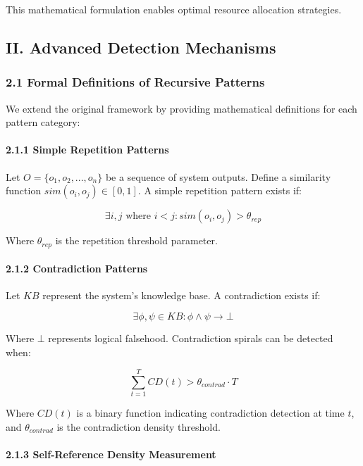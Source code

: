 \documentclass[
]{article}
\begin{document}
This mathematical formulation enables optimal resource allocation
strategies.

\subsection{II. Advanced Detection
Mechanisms}\label{ii.-advanced-detection-mechanisms}

\subsubsection{2.1 Formal Definitions of Recursive
Patterns}\label{formal-definitions-of-recursive-patterns}

We extend the original framework by providing mathematical definitions
for each pattern category:

\paragraph{2.1.1 Simple Repetition
Patterns}\label{simple-repetition-patterns}

Let \(O = \{o_1, o_2, ..., o_n\}\) be a sequence of system outputs.
Define a similarity function \(sim(o_i, o_j) \in [0,1]\). A simple
repetition pattern exists if:

\[\exists i,j \text{ where } i < j: sim(o_i, o_j) > \theta_{rep}\]

Where \(\theta_{rep}\) is the repetition threshold parameter.

\paragraph{2.1.2 Contradiction Patterns}\label{contradiction-patterns}

Let \(KB\) represent the system's knowledge base. A contradiction exists
if:

\[\exists \phi, \psi \in KB: \phi \land \psi \rightarrow \bot\]

Where \(\bot\) represents logical falsehood. Contradiction spirals can
be detected when:

\[\sum_{t=1}^{T} CD(t) > \theta_{contrad} \cdot T\]

Where \(CD(t)\) is a binary function indicating contradiction detection
at time \(t\), and \(\theta_{contrad}\) is the contradiction density
threshold.

\paragraph{2.1.3 Self-Reference Density
Measurement}\label{self-reference-density-measurement}
\end{document}

